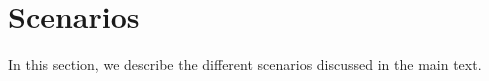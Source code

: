 
\FloatBarrier


\section{Scenarios}
\label{si:scen}
In this section, we describe the different scenarios discussed in the main text.

